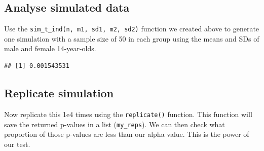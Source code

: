\documentclass[
  oneside]{book}
\newenvironment{Shaded}{\begin{snugshade}}{\end{snugshade}}
\newcommand{\DecValTok}[1]{\textcolor[rgb]{0.00,0.00,0.81}{#1}}
\newcommand{\FloatTok}[1]{\textcolor[rgb]{0.00,0.00,0.81}{#1}}
\newcommand{\FunctionTok}[1]{\textcolor[rgb]{0.00,0.00,0.00}{#1}}
\newcommand{\NormalTok}[1]{#1}
\newcommand{\OtherTok}[1]{\textcolor[rgb]{0.56,0.35,0.01}{#1}}
\newcommand{\SpecialCharTok}[1]{\textcolor[rgb]{0.00,0.00,0.00}{#1}}
\newcommand{\StringTok}[1]{\textcolor[rgb]{0.31,0.60,0.02}{#1}}
\begin{document}
\hypertarget{analyse-simulated-data}{%
\subsection{Analyse simulated data}\label{analyse-simulated-data}}

Use the \texttt{sim\_t\_ind(n,\ m1,\ sd1,\ m2,\ sd2)} function we created above to generate one simulation with a sample size of 50 in each group using the means and SDs of male and female 14-year-olds.

\begin{Shaded}
\end{Shaded}

\begin{verbatim}
## [1] 0.001543531
\end{verbatim}

\hypertarget{replicate-simulation}{%
\subsection{Replicate simulation}\label{replicate-simulation}}

Now replicate this 1e4 times using the \texttt{replicate()} function. This function will save the returned p-values in a list (\texttt{my\_reps}). We can then check what proportion of those p-values are less than our alpha value. This is the power of our test.

\begin{Shaded}
\end{Shaded}
\end{document}
